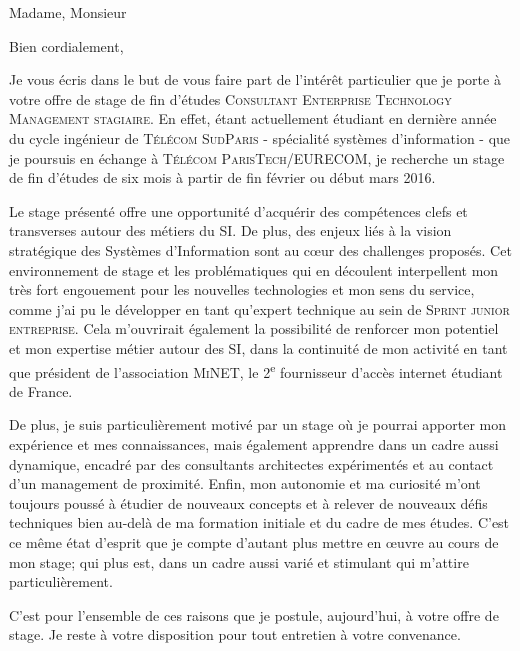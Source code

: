 \documentclass[10pt,a4paper,roman]{moderncv} %
\begin{document}
\date{25 Novembre 2015} %
\opening{Madame, Monsieur} %

\closing{Bien cordialement,} %


\makelettertitle %


\quad \quad Je vous écris dans le but de vous faire part de l'intérêt particulier que je porte à votre offre de stage de fin d'études
\textsc{Consultant Enterprise Technology Management stagiaire}. En effet, étant actuellement étudiant en dernière année du cycle
ingénieur de \textsc{Télécom SudParis} - spécialité systèmes d'information - que je poursuis en échange à
\textsc{Télécom ParisTech}/\textsc{EURECOM}, je recherche un stage de fin d’études de six mois à partir de fin février ou début mars 2016.

\quad \quad Le stage présenté offre une opportunité d'acquérir des compétences clefs et transverses autour des métiers du SI.
De plus, des enjeux liés à la vision stratégique des Systèmes d’Information sont au c\oe ur des challenges proposés.
Cet environnement de stage et les problématiques qui en découlent interpellent mon très fort engouement pour les nouvelles
technologies et mon sens du service, comme j'ai pu le développer en tant qu'expert technique au sein de \textsc{Sprint junior entreprise}.
Cela m'ouvrirait également la possibilité de renforcer mon potentiel et mon expertise métier autour des SI, dans la continuité de mon
activité en tant que président de l'association \textsc{MiNET}, le 2\textsuperscript{e} fournisseur d'accès internet étudiant de France.

\quad \quad De plus, je suis particulièrement motivé par un stage où je pourrai apporter mon expérience et mes connaissances, mais également
apprendre dans un cadre aussi dynamique, encadré par des consultants architectes expérimentés et au contact d’un management de proximité.
Enfin, mon autonomie et ma curiosité m'ont toujours poussé à étudier de nouveaux concepts et à relever de nouveaux défis techniques bien au-delà de ma
formation initiale et du cadre de mes études. C'est ce même état d'esprit que je compte d'autant plus mettre en \oe uvre au cours de mon stage;
qui plus est, dans un cadre aussi varié et stimulant qui m'attire particulièrement.

\quad \quad C’est pour l’ensemble de ces raisons que je postule, aujourd'hui, à votre offre de stage. Je reste à votre disposition pour
tout entretien à votre convenance.
\\[0.7cm]


\makeletterclosing %

\end{document}

